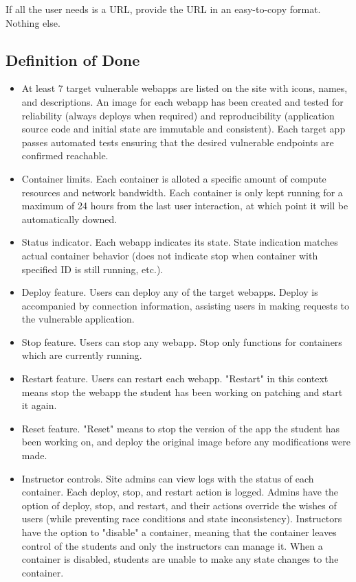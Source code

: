 \documentclass[12pt]{article}
\begin{document}
If all the user needs is a URL, provide the URL in an easy-to-copy format. Nothing else.

\subsection{Definition of Done}
\begin{itemize}
	\item At least 7 target vulnerable webapps are listed on the site with icons, names, and descriptions. An image for each webapp has been created and tested for reliability (always deploys when required) and reproducibility (application source code and initial state are immutable and consistent). Each target app passes automated tests ensuring that the desired vulnerable endpoints are confirmed reachable.
	\item Container limits. Each container is alloted a specific amount of compute resources and network bandwidth. Each container is only kept running for a maximum of 24 hours from the last user interaction, at which point it will be automatically downed.
	\item Status indicator. Each webapp indicates its state. State indication matches actual container behavior (does not indicate stop when container with specified ID is still running, etc.).
	\item Deploy feature. Users can deploy any of the target webapps. Deploy is accompanied by connection information, assisting users in making requests to the vulnerable application.
	\item Stop feature. Users can stop any webapp. Stop only functions for containers which are currently running.
	\item Restart feature. Users can restart each webapp. "Restart" in this context means stop the webapp the student has been working on patching and start it again.
	\item Reset feature. "Reset" means to stop the version of the app the student has been working on, and deploy the original image before any modifications were made.
	\item Instructor controls. Site admins can view logs with the status of each container. Each deploy, stop, and restart action is logged. Admins have the option of deploy, stop, and restart, and their actions override the wishes of users (while preventing race conditions and state inconsistency). Instructors have the option to "disable" a container, meaning that the container leaves control of the students and only the instructors can manage it. When a container is disabled, students are unable to make any state changes to the container.

\end{itemize}
\end{document}
